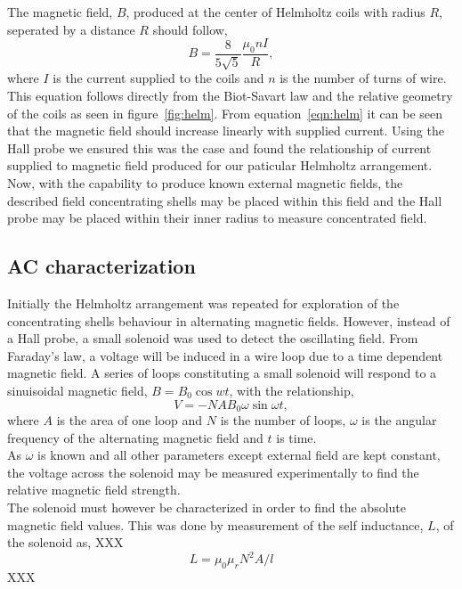 \documentclass[11pt]{iopart}
\begin{document}
The magnetic field, $B$, produced at the center of Helmholtz coils
with radius $R$, seperated by a distance $R$ should follow,
\begin{equation}
  B = \frac{8}{5\sqrt{5}}\frac{\mu_0 nI}{R},
  \label{eqn:helm}
\end{equation}
where $I$ is the current supplied to the coils and $n$ is the number of
turns of wire. This equation follows directly from the Biot-Savart law
\cite{XXX} and the relative geometry of the coils as seen in
figure~\ref{fig:helm}. From equation~\ref{eqn:helm} it can be seen that
the magnetic field should increase linearly with supplied
current. Using the Hall probe we ensured this was the case and found
the relationship of current supplied to magnetic field produced for
our paticular Helmholtz arrangement.\\ Now, with the capability to
produce known external magnetic fields, the described field
concentrating shells may be placed within this field and the Hall
probe may be placed within their inner radius to measure concentrated
field.

\subsection{AC characterization}
Initially the Helmholtz arrangement was repeated for exploration of
the concentrating shells behaviour in alternating magnetic
fields. However, instead of a Hall probe, a small solenoid was used to
detect the oscillating field. From Faraday's law, a voltage will be
induced in a wire loop due to a time dependent magnetic field. A
series of loops constituting a small solenoid will respond to a
sinuisoidal magnetic field, $B = B_0\cos{wt}$, with the relationship,
\begin{equation}
  V = -NAB_0\omega\sin{\omega t},
\end{equation}
where $A$ is the area of one loop and $N$ is the number of loops,
$\omega$ is the angular frequency of the alternating magnetic field
and $t$ is time.\\ As $\omega$ is known and all other parameters
except external field are kept constant, the voltage across the
solenoid may be measured experimentally to find the relative magnetic
field strength.\\
The solenoid must however be characterized in order to find the
absolute magnetic field values. This was done by measurement of the
self inductance, $L$, of the solenoid as, XXX
\begin{equation}
  L = \mu_0\mu_rN^2A/l
\end{equation}
XXX
\end{document}
